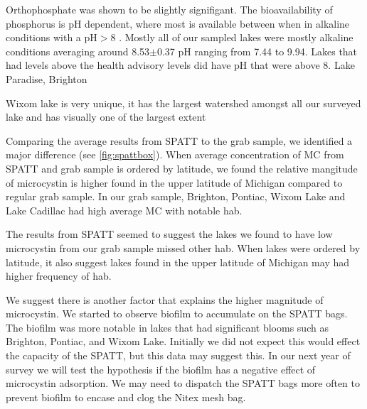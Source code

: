 Orthophosphate was shown to be slightly signifigant. The bioavailability of phosphorus is pH dependent, where most is available between when in alkaline conditions with a pH$>$8 \cite{lucas_relationships_1961}.
Mostly all of our sampled lakes were mostly alkaline conditions averaging around 8.53$\pm$0.37 pH ranging from 7.44 to 9.94. Lakes that had levels above the health advisory levels did have pH that were above 8. Lake Paradise, Brighton %

Wixom lake is very unique, it has the largest watershed amongst all our surveyed lake and has visually one of the largest extent


Comparing the average results from SPATT to the grab sample, we identified a major difference (see \ref{fig:spattbox}). When average concentration of MC from SPATT and grab sample is ordered by latitude, we found the relative mangitude of microcystin is higher found in the upper latitude of Michigan compared to regular grab sample. In our grab sample, Brighton, Pontiac, Wixom Lake and Lake Cadillac had high average MC with notable \gls{hab}.

The results from SPATT seemed to suggest the lakes we found to have low microcystin from our grab sample missed other \gls{hab}. When lakes were ordered by latitude, it also suggest lakes found in the upper latitude of Michigan may had higher frequency of \gls{hab}.

We suggest there is another factor that explains the higher magnitude of microcystin. We started to observe biofilm to accumulate on the SPATT bags. The biofilm was more notable in lakes that had significant blooms such as Brighton, Pontiac, and Wixom Lake. Initially we did not expect this would effect the capacity of the SPATT, but this data may suggest this. In our next year of survey we will test the hypothesis if the biofilm has a negative effect of microcystin adsorption. We may need to dispatch the SPATT bags more often to prevent biofilm to encase and clog the Nitex mesh bag.

